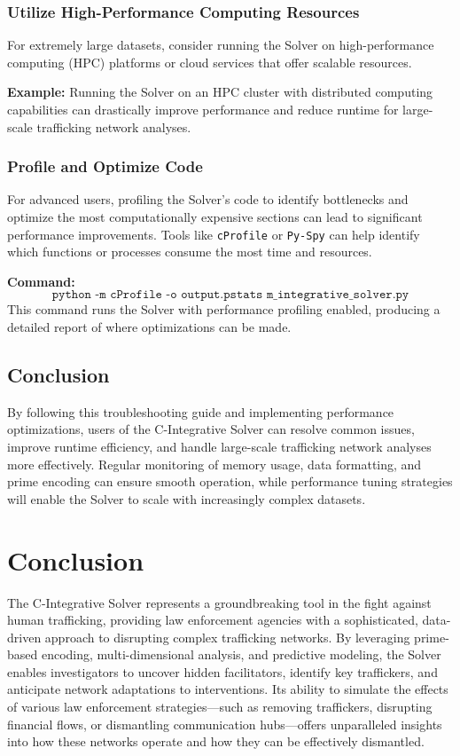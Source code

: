 \documentclass[%
 preprint, linenumbers,
 amsmath,amssymb,
 aps, physrev,
]{revtex4-2}
\begin{document}
\subsubsection{Utilize High-Performance Computing Resources}

For extremely large datasets, consider running the Solver on high-performance computing (HPC) platforms or cloud services that offer scalable resources.

\textbf{Example:} Running the Solver on an HPC cluster with distributed computing capabilities can drastically improve performance and reduce runtime for large-scale trafficking network analyses.

\subsubsection{Profile and Optimize Code}

For advanced users, profiling the Solver’s code to identify bottlenecks and optimize the most computationally expensive sections can lead to significant performance improvements. Tools like \texttt{cProfile} or \texttt{Py-Spy} can help identify which functions or processes consume the most time and resources.

\textbf{Command:}
\[
\texttt{python -m cProfile -o output.pstats m\_integrative\_solver.py}
\]
This command runs the Solver with performance profiling enabled, producing a detailed report of where optimizations can be made.

\subsection{Conclusion}

By following this troubleshooting guide and implementing performance optimizations, users of the C-Integrative Solver can resolve common issues, improve runtime efficiency, and handle large-scale trafficking network analyses more effectively. Regular monitoring of memory usage, data formatting, and prime encoding can ensure smooth operation, while performance tuning strategies will enable the Solver to scale with increasingly complex datasets.

\section{Conclusion}

The C-Integrative Solver represents a groundbreaking tool in the fight against human trafficking, providing law enforcement agencies with a sophisticated, data-driven approach to disrupting complex trafficking networks. By leveraging prime-based encoding, multi-dimensional analysis, and predictive modeling, the Solver enables investigators to uncover hidden facilitators, identify key traffickers, and anticipate network adaptations to interventions. Its ability to simulate the effects of various law enforcement strategies—such as removing traffickers, disrupting financial flows, or dismantling communication hubs—offers unparalleled insights into how these networks operate and how they can be effectively dismantled.
\end{document}
